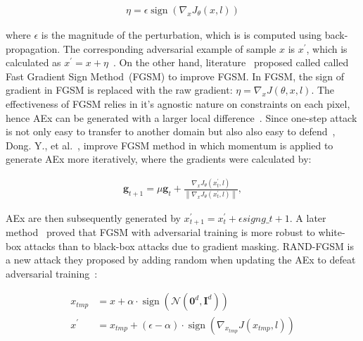 \vspace{-6mm}
\begin{align}
    \eta=\epsilon \operatorname{sign}\left(\nabla_{x} J_{\theta}(x, l)\right)
    \label{eq:fgsm_eta}
\end{align}

\hspace*{3.5mm} where $\epsilon$ is the magnitude of the perturbation, which is is computed using back-propagation. The corresponding adversarial example of sample $x$ is $x^{\prime}$, which is calculated as $x^{\prime}=x+\eta$~\cite{yuan2019adversarial}. On the other hand, literature~\cite{rozsa2016adversarial} proposed called called Fast Gradient Sign Method~(FGSM) to improve FGSM. In FGSM, the sign of gradient in FGSM is replaced with the raw gradient: $\eta=\nabla_{x} J(\theta, x, l)$. The effectiveness of FGSM relies in it's agnostic nature on constraints on each pixel, hence AEx can be generated with a larger local difference~\cite{yuan2019adversarial}. Since one-step attack is not only easy to transfer to another domain but also also easy to defend~\cite{yuan2019adversarial}, Dong. Y., et al.~\cite{dong2018boosting}, improve FGSM method in which momentum is applied to generate AEx more iteratively, where the gradients were calculated by:

\vspace{-6mm}
\begin{align}
    \mathbf{g}_{t+1}=\mu \mathbf{g}_{t}+\frac{\nabla_{x} J_{\theta}\left(x_{t}^{\prime}, l\right)}{\left\|\nabla_{x} J_{\theta}\left(x_{t}^{\prime}, l\right)\right\|},
\end{align}

\hspace*{3.5mm} AEx are then subsequently generated by   $x_{t+1}^{\prime}=x_{t}^{\prime}+ \epsilon sign g\_{t+1}$. A later method~\cite{tramer2017ensemble} proved that FGSM with adversarial training is more robust to white-box attacks than to black-box attacks due to gradient masking. RAND-FGSM is a new attack they proposed by adding random when updating the AEx to defeat adversarial training~\cite{yuan2019adversarial}:

\vspace{-6mm}
\begin{align}
    x_{t m p} &=x+\alpha \cdot \operatorname{sign}\left(\mathcal{N}\left(\mathbf{0}^{d}, \mathbf{I}^{d}\right)\right) \\
    x^{\prime} &=x_{t m p}+(\epsilon-\alpha) \cdot \operatorname{sign}\left(\nabla_{x_{t m p}} J\left(x_{t m p}, l\right)\right)
\end{align}
    
